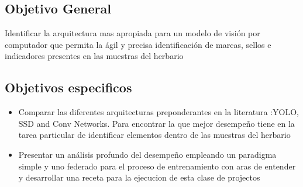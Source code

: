 

\subsection{Objetivo General} 

Identificar la arquitectura mas apropiada para un modelo de visión por computador que permita la ágil y precisa identificación de marcas, sellos e indicadores presentes en las muestras del herbario

\subsection{Objetivos especificos}

\begin{itemize}
    \item Comparar las diferentes arquitecturas preponderantes en la literatura :YOLO, SSD and Conv Networks.  Para encontrar la que mejor desempeño tiene en la tarea particular de identificar elementos dentro de las muestras del herbario
    
    \item Presentar un análisis profundo del desempeño  empleando un paradigma simple y uno federado para el  proceso de entrenamiento con aras de entender y desarrollar una receta para la ejecucion de esta clase de projectos
\end{itemize}



